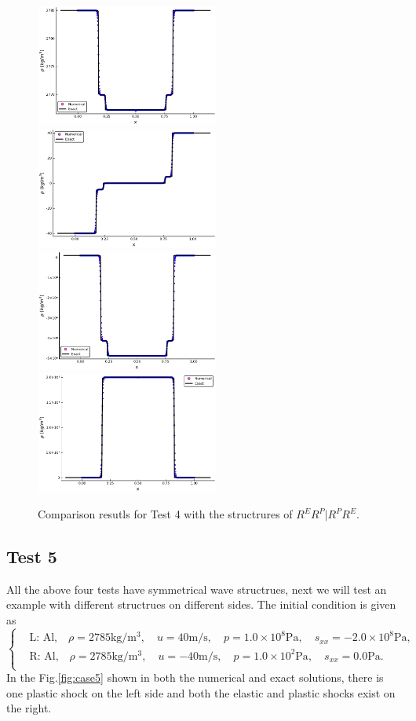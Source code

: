 \documentclass[review]{elsarticle}
\begin{document}
\begin{figure}
  \centering

  \includegraphics[width= 6cm] {case3rho.pdf}
  \includegraphics[width= 6cm] {case3u.pdf}
  \includegraphics[width= 6cm] {case3p.pdf}
  \includegraphics[width= 6cm] {case3sxx.pdf}

    \caption{Comparison resutls for Test 4 with the structrures of $R^ER^P|R^PR^E$.  }
  \label{fig:case4}
\end{figure}
\subsection{Test 5}
All the above four tests have symmetrical wave  structrues, next we will test an example with different structrues on different sides. The initial condition is given as
\begin{equation}
 \left\{ \begin{aligned}
&	 \text{L: Al,}\quad  \rho = 2785 \text{kg}/\text{m}^3, \quad  u = 40\text{m}/\text{s}, \quad  p = 1.0\times 10^8\text{Pa}, \quad  s_{xx}=-2.0\times 10^8 \text{Pa},\\
&	 \text{R: Al,}\quad  \rho = 2785 \text{kg}/\text{m}^3, \quad  u = -40\text{m}/\text{s}, \quad  p = 1.0 \times 10^2 \text{Pa}, \quad  s_{xx}=0.0\text{Pa}.\\
   \end{aligned}
 \right.
\end{equation}
In the Fig.\ref{fig:case5} shown in both the numerical and exact solutions, there is one plastic shock on the left side and both the elastic and plastic shocks exist on the right.  
\end{document}
